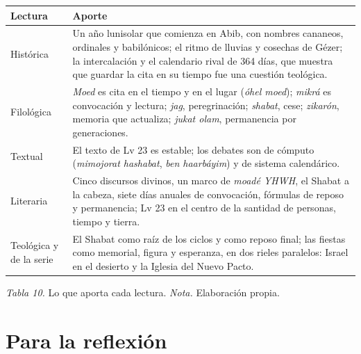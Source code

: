 \documentclass[11pt,letterpaper]{article}
\begin{document}
\begin{center}\small\renewcommand{\arraystretch}{1.2}
\begin{tabular}{@{}L{3.0cm}L{12.2cm}@{}}
\toprule
\textbf{Lectura} & \textbf{Aporte} \\ \midrule
Histórica & Un año lunisolar que comienza en Abib, con nombres cananeos, ordinales y babilónicos; el ritmo de lluvias y cosechas de Gézer; la intercalación y el calendario rival de 364 días, que muestra que guardar la cita en su tiempo fue una cuestión teológica. \\
Filológica & \emph{Moed} es cita en el tiempo y en el lugar (\emph{óhel moed}); \emph{mikrá} es convocación y lectura; \emph{jag}, peregrinación; \emph{shabat}, cese; \emph{zikarón}, memoria que actualiza; \emph{jukat olam}, permanencia por generaciones. \\
Textual & El texto de Lv 23 es estable; los debates son de cómputo (\emph{mimojorat hashabat}, \emph{ben haarbáyim}) y de sistema calendárico. \\
Literaria & Cinco discursos divinos, un marco de \emph{moadé YHWH}, el Shabat a la cabeza, siete días anuales de convocación, fórmulas de reposo y permanencia; Lv 23 en el centro de la santidad de personas, tiempo y tierra. \\
Teológica y de la serie & El Shabat como raíz de los ciclos y como reposo final; las fiestas como memorial, figura y esperanza, en dos rieles paralelos: Israel en el desierto y la Iglesia del Nuevo Pacto. \\
\bottomrule
\end{tabular}\par
{\footnotesize\color{sepia}\textit{Tabla 10.} Lo que aporta cada lectura. \textit{Nota.} Elaboración propia.}
\end{center}

\section{Para la reflexión}\label{sec:reflexion}
\end{document}
